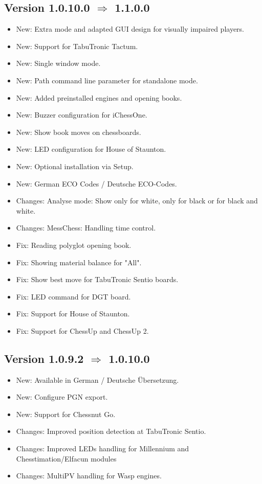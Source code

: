 \documentclass[11pt,a4paper]{article}
\begin{document}
\subsection*{Version 1.0.10.0 $\Rightarrow$  1.1.0.0}
\begin{itemize}			
	\item {\color{blue}New}: Extra mode and adapted GUI design for visually impaired players.
	\item {\color{blue}New}: Support for TabuTronic Tactum.
	\item {\color{blue}New}: Single window mode.
	\item {\color{blue}New}: Path command line parameter for standalone mode.
	\item {\color{blue}New}: Added preinstalled engines and opening books.
    \item {\color{blue}New}: Buzzer configuration for iChessOne.
    \item {\color{blue}New}: Show book moves on chessboards.
    \item {\color{blue}New}: LED configuration for House of Staunton.	
    \item {\color{blue}New}: Optional installation via Setup.
    \item {\color{blue}New}: German ECO Codes / Deutsche ECO-Codes.
    \item {\color{teal}Changes}: Analyse mode: Show only for white, only for black or for black and white.
	\item {\color{teal}Changes}: MessChess: Handling time control.
	\item {\color{red}Fix}: Reading polyglot opening book.
	\item {\color{red}Fix}: Showing material balance for "All".
	\item {\color{red}Fix}: Show best move for TabuTronic Sentio boards.
	\item {\color{red}Fix}: LED command for DGT board.
	\item {\color{red}Fix}: Support for House of Staunton.
	\item {\color{red}Fix}: Support for ChessUp and ChessUp 2.
\end{itemize}

\subsection*{Version 1.0.9.2 $\Rightarrow$  1.0.10.0}
\begin{itemize}			
		\item {\color{blue}New}: Available in German / Deutsche Übersetzung.
		\item {\color{blue}New}: Configure PGN export.
		\item {\color{blue}New}: Support for Chessnut Go.
		\item {\color{teal}Changes}: Improved position detection at TabuTronic Sentio.
		\item {\color{teal}Changes}: Improved LEDs handling for Millennium and Chesstimation/Elfacun modules
		\item {\color{teal}Changes}: MultiPV handling for Wasp engines.
	
\end{itemize}
\end{document}
